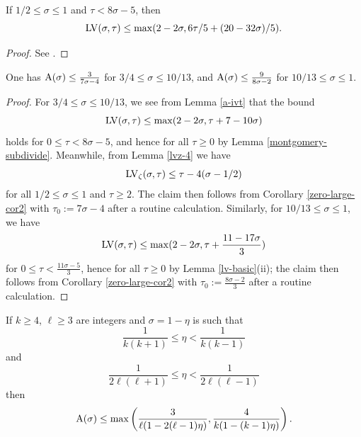 \begin{lemma}\label{a-ivt}  If $1/2 \leq \sigma \leq 1$ and $\tau < 8\sigma-5$, then
    $$ \mathrm{LV}(\sigma,\tau) \leq \max( 2-2\sigma, 6\tau/5 + (20-32\sigma)/5 ).$$
\end{lemma}

\begin{proof} See \cite[(11.95)]{ivic}.
\end{proof}

\begin{corollary}\label{ivic-near-34}\cite[Theorem 11.5]{ivic}  One has $\mathrm{A}(\sigma) \leq \frac{3}{7\sigma-4}$ for $3/4 \leq \sigma \leq 10/13$, and $\mathrm{A}(\sigma) \leq \frac{9}{8\sigma-2}$ for $10/13 \leq \sigma \leq 1$.
\end{corollary}

\begin{proof}  For $3/4 \leq \sigma \leq 10/13$, we see from Lemma \ref{a-ivt} that the bound
$$ \mathrm{LV}(\sigma,\tau) \leq \max(2-2\sigma, \tau + 7 - 10\sigma )$$
holds for $0 \leq \tau < 8\sigma-5$, and hence for all $\tau \geq 0$ by Lemma \ref{montgomery-subdivide}.  Meanwhile, from Lemma \ref{lvz-4} we have
$$\mathrm{LV}_\zeta(\sigma,\tau) \leq \tau - 4 (\sigma-1/2)$$
for all $1/2 \leq \sigma \leq 1$ and $\tau \geq 2$. The claim then follows from Corollary
\ref{zero-large-cor2} with $\tau_0 := 7\sigma-4$ after a routine calculation.  Similarly, for $10/13 \leq \sigma \leq 1$, we have
$$ \mathrm{LV}(\sigma,\tau) \leq \max(2-2\sigma, \tau + \frac{11 - 17 \sigma}{3} )$$
for $0 \leq \tau < \frac{11\sigma-5}{3}$, hence for all $\tau \geq 0$ by Lemma \ref{lv-basic}(ii); the claim then follows from Corollary
\ref{zero-large-cor2} with $\tau_0 := \frac{8\sigma-2}{3}$ after a routine calculation.
\end{proof}


\begin{theorem}\label{pintz-density}\cite[Theorem 1]{pintz_density_2023}  If $k \geq 4$, $\ell \geq 3$ are integers and $\sigma = 1-\eta$ is such that
\begin{equation}\label{eta-b}
    \frac{1}{k(k+1)} \leq \eta < \frac{1}{k(k-1)}
\end{equation}
and
\begin{equation}\label{eta-l}
 \frac{1}{2\ell(\ell+1)} \leq \eta < \frac{1}{2\ell(\ell-1)}
\end{equation}
then
$$ \mathrm{A}(\sigma) \leq \max\left( \frac{3}{\ell(1-2(\ell-1)\eta)}, \frac{4}{k(1-(k-1)\eta)}\right).$$
\end{theorem}
\literature
{}

